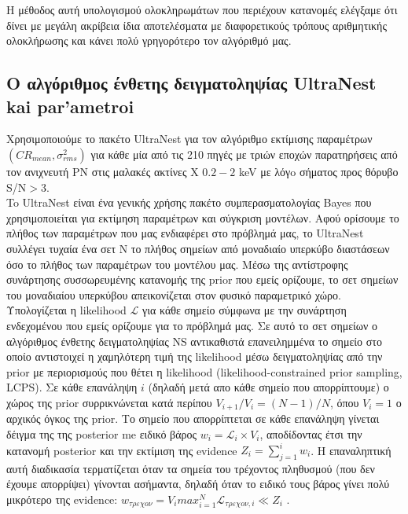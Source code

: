 Η μέθοδος αυτή υπολογισμού ολοκληρωμάτων που περιέχουν κατανομές ελέγξαμε ότι δίνει με μεγάλη ακρίβεια ίδια αποτελέσματα με διαφορετικούς τρόπους αριθμητικής ολοκλήρωσης και κάνει πολύ γρηγορότερο τον αλγόριθμό μας.


\subsection{Ο αλγόριθμος ένθετης δειγματοληψίας \textlatin{UltraNest} kai par'ametroi}

Χρησιμοποιούμε το πακέτο \textlatin{UltraNest}\cite{ULTRANEST} για τον αλγόριθμο εκτίμισης παραμέτρων $(CR_{mean}, \sigma_{rms}^2)$ για κάθε μία από τις 210 πηγές με τριών εποχών παρατηρήσεις από τον ανιχνευτή ΡΝ στις μαλακές ακτίνες Χ $0.2-2$ \textlatin{keV} με λόγo σήματος προς θόρυβο \textlatin{S/N}$>3$. \\
To \textlatin{UltraNest} είναι ένα γενικής χρήσης πακέτο συμπερασματολογίας \textlatin{Bayes} που χρησιμοποιείται για εκτίμηση παραμέτρων και σύγκριση μοντέλων. Αφού ορίσουμε το πλήθος των παραμέτρων που μας ενδιαφέρει στο πρόβλημά μας, το \textlatin{UltraNest} συλλέγει τυχαία ένα σετ Ν το πλήθος σημείων από μοναδιαίο υπερκύβο διαστάσεων όσο το πλήθος των παραμέτρων του μοντέλου μας. Μέσω της αντίστροφης συνάρτησης συσσωρευμένης κατανομής της \textlatin{prior} που εμείς ορίζουμε, το σετ σημείων του μοναδιαίου υπερκύβου απεικονίζεται στον φυσικό παραμετρικό χώρο. Υπολογίζεται η  \textlatin{likelihood} $\mathcal{L}$ για κάθε σημείο σύμφωνα με την συνάρτηση ενδεχομένου που εμείς ορίζουμε για το πρόβλημά μας. Σε αυτό το σετ σημείων ο αλγόριθμος ένθετης δειγματοληψίας \textlatin{NS} αντικαθιστά επανειλημμένα το σημείο στο οποίο αντιστοιχεί η χαμηλότερη τιμή της \textlatin{likelihood} μέσω δειγματοληψίας από την \textlatin{prior} με περιορισμούς που θέτει η \textlatin{likelihood (likelihood-constrained prior sampling, LCPS)}. Σε κάθε επανάληψη $i$ (δηλαδή μετά απο κάθε σημείο που απορρίπτουμε) ο χώρος της \textlatin{prior} συρρικνώνεται κατά περίπου $V_{i+1}/V_i= (N−1)/N$, όπου $V_i=1$ ο αρχικός όγκος της \textlatin{prior}. Το σημείο που απορρίπτεται σε κάθε επανάληψη γίνεται δέιγμα της της \textlatin{posterior} me ειδικό βάρος $w_i=\mathcal{L}_i \times V_i$, αποδίδοντας έτσι την κατανομή \textlatin{posterior} και την εκτίμιση της \textlatin{evidence} $Z_i= \sum_{j=1}^i  w_i$. H επαναληπτική αυτή διαδικασία τερματίζεται όταν τα σημεία του τρέχοντος πληθυσμού (που δεν έχουμε απορρίψει) γίνονται ασήμαντα, δηλαδή όταν το ειδικό τους βάρος γίνει πολύ μικρότερο της \textlatin{evidence}:  $w_{τρεχον} = V_i max_{i=1}^N \mathcal{L}_{τρεχον, i} \ll Z_i$ \cite{ULTRANEST}.

